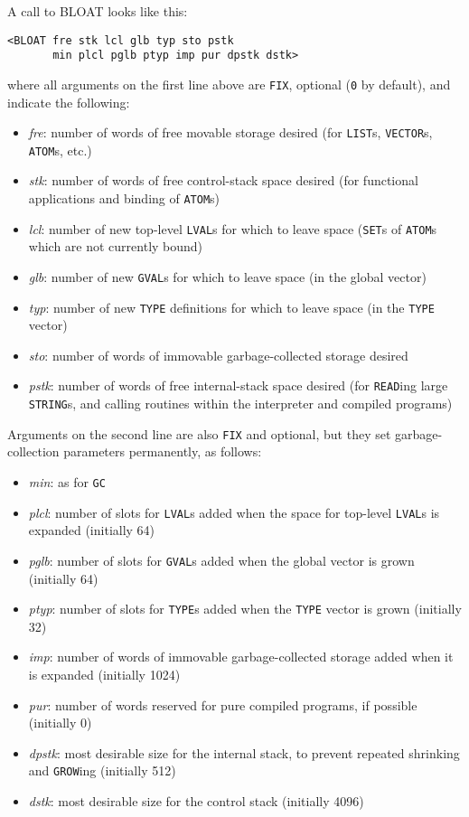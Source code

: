 \documentclass[a4paper,]{article}
\providecommand{\tightlist}{%
  \setlength{\itemsep}{0pt}\setlength{\parskip}{0pt}}
\begin{document}
A call to BLOAT looks like this:

\begin{verbatim}
<BLOAT fre stk lcl glb typ sto pstk
       min plcl pglb ptyp imp pur dpstk dstk>
\end{verbatim}

where all arguments on the first line above are \texttt{FIX}, optional (\texttt{0} by default), and indicate the following:

\begin{itemize}
\tightlist
\item
  \emph{fre}: number of words of free movable storage desired (for \texttt{LIST}s, \texttt{VECTOR}s, \texttt{ATOM}s, etc.)
\item
  \emph{stk}: number of words of free control-stack space desired (for functional applications and binding of
  \texttt{ATOM}s)
\item
  \emph{lcl}: number of new top-level \texttt{LVAL}s for which to leave space (\texttt{SET}s of \texttt{ATOM}s which are
  not currently bound)
\item
  \emph{glb}: number of new \texttt{GVAL}s for which to leave space (in the global vector)
\item
  \emph{typ}: number of new \texttt{TYPE} definitions for which to leave space (in the \texttt{TYPE} vector)
\item
  \emph{sto}: number of words of immovable garbage-collected storage desired
\item
  \emph{pstk}: number of words of free internal-stack space desired (for \texttt{READ}ing large \texttt{STRING}s, and
  calling routines within the interpreter and compiled programs)
\end{itemize}

Arguments on the second line are also \texttt{FIX} and optional, but they set garbage-collection parameters permanently, as
follows:

\begin{itemize}
\tightlist
\item
  \emph{min}: as for \texttt{GC}
\item
  \emph{plcl}: number of slots for \texttt{LVAL}s added when the space for top-level \texttt{LVAL}s is expanded (initially
  64)
\item
  \emph{pglb}: number of slots for \texttt{GVAL}s added when the global vector is grown (initially 64)
\item
  \emph{ptyp}: number of slots for \texttt{TYPE}s added when the \texttt{TYPE} vector is grown (initially 32)
\item
  \emph{imp}: number of words of immovable garbage-collected storage added when it is expanded (initially 1024)
\item
  \emph{pur}: number of words reserved for pure compiled programs, if possible (initially 0)
\item
  \emph{dpstk}: most desirable size for the internal stack, to prevent repeated shrinking and \texttt{GROW}ing (initially
  512)
\item
  \emph{dstk}: most desirable size for the control stack (initially 4096)
\end{itemize}
\end{document}
